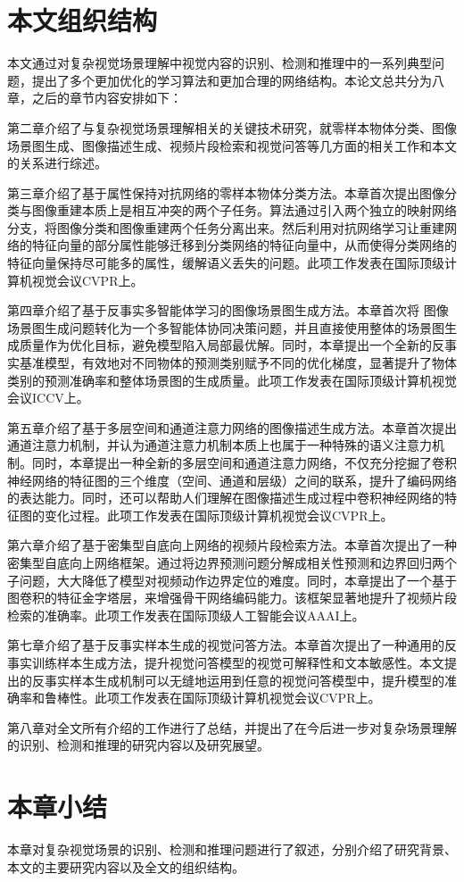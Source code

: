 \section{本文组织结构}
本文通过对复杂视觉场景理解中视觉内容的识别、检测和推理中的一系列典型问题，提出了多个更加优化的学习算法和更加合理的网络结构。本论文总共分为八章，之后的章节内容安排如下：

\begin{asparaitem}

\item 第二章介绍了与复杂视觉场景理解相关的关键技术研究，就零样本物体分类、图像场景图生成、图像描述生成、视频片段检索和视觉问答等几方面的相关工作和本文的关系进行综述。

\item 第三章介绍了基于属性保持对抗网络的零样本物体分类方法。本章首次提出图像分类与图像重建本质上是相互冲突的两个子任务。算法通过引入两个独立的映射网络分支，将图像分类和图像重建两个任务分离出来。然后利用对抗网络学习让重建网络的特征向量的部分属性能够迁移到分类网络的特征向量中，从而使得分类网络的特征向量保持尽可能多的属性，缓解语义丢失的问题。此项工作发表在国际顶级计算机视觉会议CVPR上。

\item 第四章介绍了基于反事实多智能体学习的图像场景图生成方法。本章首次将
图像场景图生成问题转化为一个多智能体协同决策问题，并且直接使用整体的场景图生成质量作为优化目标，避免模型陷入局部最优解。同时，本章提出一个全新的反事实基准模型，有效地对不同物体的预测类别赋予不同的优化梯度，显著提升了物体类别的预测准确率和整体场景图的生成质量。此项工作发表在国际顶级计算机视觉会议ICCV上。

\item 第五章介绍了基于多层空间和通道注意力网络的图像描述生成方法。本章首次提出通道注意力机制，并认为通道注意力机制本质上也属于一种特殊的语义注意力机制。同时，本章提出一种全新的多层空间和通道注意力网络，不仅充分挖掘了卷积神经网络的特征图的三个维度（空间、通道和层级）之间的联系，提升了编码网络的表达能力。同时，还可以帮助人们理解在图像描述生成过程中卷积神经网络的特征图的变化过程。此项工作发表在国际顶级计算机视觉会议CVPR上。

\item 第六章介绍了基于密集型自底向上网络的视频片段检索方法。本章首次提出了一种密集型自底向上网络框架。通过将边界预测问题分解成相关性预测和边界回归两个子问题，大大降低了模型对视频动作边界定位的难度。同时，本章提出了一个基于图卷积的特征金字塔层，来增强骨干网络编码能力。该框架显著地提升了视频片段检索的准确率。此项工作发表在国际顶级人工智能会议AAAI上。

\item 第七章介绍了基于反事实样本生成的视觉问答方法。本章首次提出了一种通用的反事实训练样本生成方法，提升视觉问答模型的视觉可解释性和文本敏感性。本文提出的反事实样本生成机制可以无缝地运用到任意的视觉问答模型中，提升模型的准确率和鲁棒性。此项工作发表在国际顶级计算机视觉会议CVPR上。

\item 第八章对全文所有介绍的工作进行了总结，并提出了在今后进一步对复杂场景理解的识别、检测和推理的研究内容以及研究展望。

\end{asparaitem}

\section{本章小结}
本章对复杂视觉场景的识别、检测和推理问题进行了叙述，分别介绍了研究背景、本文的主要研究内容以及全文的组织结构。

